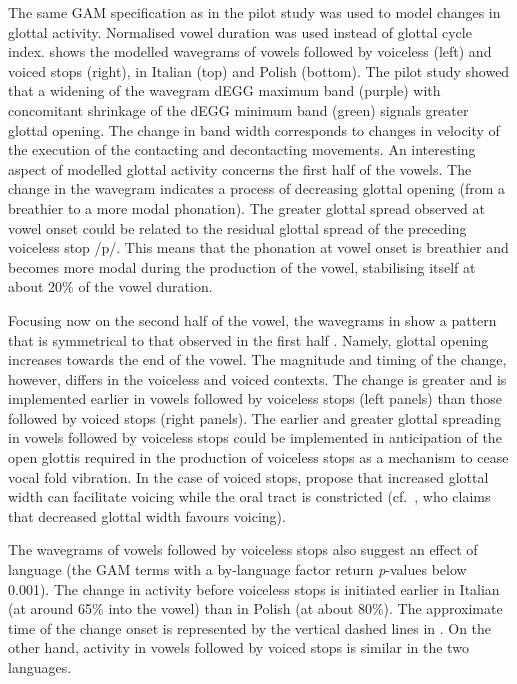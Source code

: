 \documentclass[
  11pt,
  a4paper,
]{article}
\begin{document}
The same GAM specification as in the pilot study was used to model
changes in glottal activity. Normalised vowel duration was used instead
of glottal cycle index.  shows the modelled wavegrams of
vowels followed by voiceless (left) and voiced stops (right), in Italian
(top) and Polish (bottom). The pilot study showed that a widening of the
wavegram dEGG maximum band (purple) with concomitant shrinkage of the
dEGG minimum band (green) signals greater glottal opening. The change in
band width corresponds to changes in velocity of the execution of the
contacting and decontacting movements. An interesting aspect of modelled
glottal activity concerns the first half of the vowels. The change in
the wavegram indicates a process of decreasing glottal opening (from a
breathier to a more modal phonation). The greater glottal spread
observed at vowel onset could be related to the residual glottal spread
of the preceding voiceless stop /p/. This means that the phonation at
vowel onset is breathier and becomes more modal during the production of
the vowel, stabilising itself at about 20\% of the vowel duration.

Focusing now on the second half of the vowel, the wavegrams in
 show a pattern that is symmetrical to that observed in
the first half \citep{halle1967a}. Namely, glottal opening increases
towards the end of the vowel. The magnitude and timing of the change,
however, differs in the voiceless and voiced contexts. The change is
greater and is implemented earlier in vowels followed by voiceless stops
(left panels) than those followed by voiced stops (right panels). The
earlier and greater glottal spreading in vowels followed by voiceless
stops could be implemented in anticipation of the open glottis required
in the production of voiceless stops as a mechanism to cease vocal fold
vibration. In the case of voiced stops, \citet{halle1967a} propose that
increased glottal width can facilitate voicing while the oral tract is
constricted (cf.~\citealt{westbury1983}, who claims that decreased
glottal width favours voicing).

The wavegrams of vowels followed by voiceless stops also suggest an
effect of language (the GAM terms with a by-language factor return
\emph{p}-values below 0.001). The change in activity before voiceless
stops is initiated earlier in Italian (at around 65\% into the vowel)
than in Polish (at about 80\%). The approximate time of the change onset
is represented by the vertical dashed lines in . On the
other hand, activity in vowels followed by voiced stops is similar in
the two languages.
\end{document}
